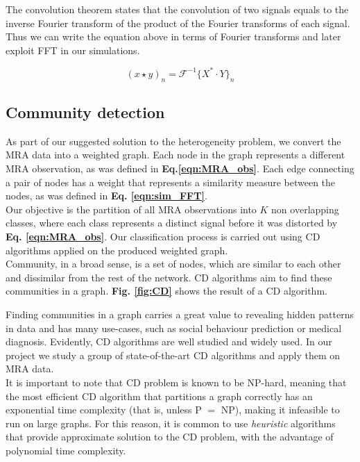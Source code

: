The convolution theorem states that the convolution of two signals  equals to the inverse Fourier transform of the product of the Fourier transforms of each signal. Thus we can write the equation above in terms of Fourier transforms and later exploit \acrshort{FFT} in our simulations.

\begin{equation}
\label{eqn:sim_FFT}
(x \star y)_n = \mathcal{F}^{-1}\lbrace X^* \cdot Y {\rbrace}_n
\end{equation}

\clearpage

\subsection{Community detection}

As part of our suggested solution to the heterogeneity problem, we convert the \acrshort{MRA} data into a weighted graph. Each node in the graph represents a different \acrshort{MRA} observation, as was defined in \textbf{Eq.\ref{eqn:MRA_obs}}. Each edge connecting a pair of nodes has a weight that represents a similarity measure between the nodes, as was defined in \textbf{Eq. \ref{eqn:sim_FFT}}.\\

Our objective is the partition of all \acrshort{MRA} observations into $K$ non overlapping classes, where each class represents a distinct signal before it was distorted by \textbf{Eq. \ref{eqn:MRA_obs}}. Our classification process is carried out using \acrfull{CD} algorithms applied on the produced weighted graph.\\

Community, in a broad sense, is a set of nodes, which are similar to each other and dissimilar from the rest of the network. \acrfull{CD} algorithms aim to find these communities in a graph. \textbf{Fig. \ref{fig:CD}} shows the result of a \acrshort{CD} algorithm.

Finding communities in a graph carries a great value to revealing hidden patterns in data and has many use-cases, such as social behaviour prediction \cite{zachary1976} or medical diagnosis\cite{guimera2005}. Evidently, \acrlong{CD} algorithms are well studied and widely used. In our project we study a group of state-of-the-art \acrshort{CD} algorithms and apply them on \acrshort{MRA} data.\\

It is important to note that \acrshort{CD} problem is known to be \textsc{NP}-hard\cite{Fortunato_2010}, meaning that the most efficient \acrshort{CD} algorithm that partitions a graph correctly has an exponential time complexity (that is, unless \textsc{P} $=$ \textsc{NP}), making it infeasible to run on large graphs. For this reason, it is common to use \textit{heuristic} algorithms that provide approximate solution to the \acrshort{CD} problem, with the advantage of polynomial time complexity.

